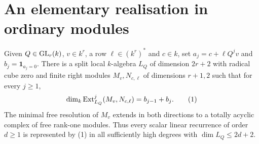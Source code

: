 \documentclass[11pt]{article}
\begin{document}
\section{An elementary realisation in ordinary modules}
\begin{thm}\label{recur}
Given $Q\in{\rm GL}_r(k)$, $v\in k^r$, a row $\ell\in (k^r)^*$ and
$c\in k$, set $a_j=c+\ell Q^jv$ and $b_j=\mathbf1_{a_j=0}$.
There is a split local $k$-algebra $L_Q$ of dimension $2r+2$ with
radical cube zero and finite right modules $M_v,N_{c,\ell}$ of
dimensions $r+1,2$ such that for every $j\ge1$,
\[
             \dim_k\operatorname{Ext}^j_{L_Q}(M_v,N_{c,\ell})=b_{j-1}+b_j .
                                                        \tag{1}
\]
The minimal free resolution of $M_v$ extends in both directions to
a totally acyclic complex of free rank-one modules. Thus every scalar
linear recurrence of order $d\ge1$ is represented by (1) in all
sufficiently high degrees with $\dim L_Q\le 2d+2$.
\end{thm}
\end{document}
